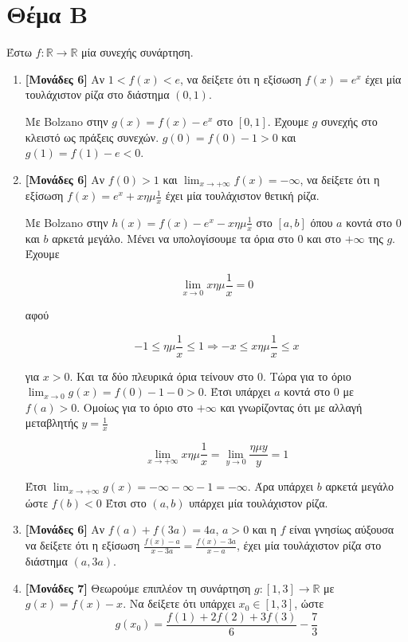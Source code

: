\documentclass[12pt]{article}
\begin{document}
  \section*{Θέμα Β}
    \noindent
    Έστω $f:\mathbb{R}\to \mathbb{R}$ μία συνεχής συνάρτηση.
    \begin{enumerate}
      \item \textbf{[Μονάδες 6]} Αν $1<f(x)<e$, να δείξετε ότι η εξίσωση $f(x)=e^x$ έχει μία τουλάχιστον ρίζα στο διάστημα $(0,1)$.

      Με Bolzano στην $g(x)=f(x)-e^x$ στο $[0,1]$. Έχουμε $g$ συνεχής στο κλειστό ως πράξεις συνεχών. $g(0)=f(0)-1>0$ και $g(1)=f(1)-e<0$.
      \item \textbf{[Μονάδες 6]} Αν $f(0)>1$ και $\lim_{x\to +\infty}f(x)=-\infty$, να δείξετε ότι η εξίσωση $f(x)=e^x+x ημ\frac{1}{x}$ έχει μία τουλάχιστον θετική ρίζα.

      Με Bolzano στην $h(x)=f(x)-e^x-x ημ\frac{1}{x}$ στο $[a,b]$ όπου $a$ κοντά στο $0$ και $b$ αρκετά μεγάλο. Μένει να υπολογίσουμε τα όρια στο 0 και στο $+\infty$ της $g$. Έχουμε

      $$\lim_{x\to 0}x ημ\frac{1}{x}=0$$

      αφού

      $$-1\le ημ\frac{1}{x}\le 1 \Rightarrow -x \le x ημ\frac{1}{x} \le x$$

      για $x>0$. Και τα δύο πλευρικά όρια τείνουν στο 0. Τώρα για το όριο $\lim_{x\to 0}g(x)=f(0)-1-0>0$. Έτσι υπάρχει $a$ κοντά στο $0$ με $f(a)>0$. Ομοίως για το όριο στο $+\infty$ και γνωρίζοντας ότι με αλλαγή μεταβλητής $y=\frac{1}{x}$

$$\lim_{x\to +\infty}x ημ\frac{1}{x}=\lim_{y\to 0}\frac{ημy}{y}=1$$

Έτσι $\lim_{x\to +\infty}g(x)=-\infty-\infty-1=-\infty$. Άρα υπάρχει $b$ αρκετά μεγάλο ώστε $f(b)<0$ Έτσι στο $(a,b)$ υπάρχει μία τουλάχιστον ρίζα.

      \item \textbf{[Μονάδες 6]} Αν $f(a)+f(3a)=4a$, $a>0$ και η $f$ είναι γνησίως αύξουσα να δείξετε ότι η εξίσωση $\frac{f(x)-a}{x-3a}=\frac{f(x)-3a}{x-a}$, έχει μία τουλάχιστον ρίζα στο διάστημα $(a,3a)$.
      \item \textbf{[Μονάδες 7]} Θεωρούμε επιπλέον τη συνάρτηση $g:[1,3]\to \mathbb{R}$ με $g(x)=f(x)-x$. Να δείξετε ότι υπάρχει $x_0\in [1,3]$, ώστε $$g(x_0)=\frac{f(1)+2f(2)+3f(3)}{6}-\frac{7}{3}$$
    \end{enumerate}
\end{document}
